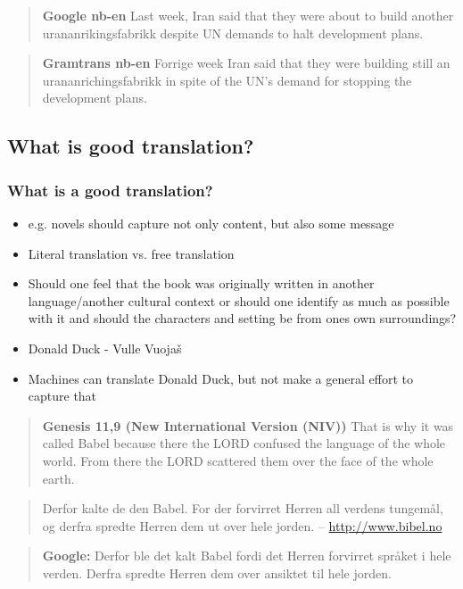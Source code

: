 \documentclass[a4paper,english,12pt]{article}
\begin{document}
\begin{quote}
{\bf Google nb-en}
Last week, Iran said that they were about to build another urananrikingsfabrikk despite UN demands to halt development plans. 
\end{quote}

\begin{quote}
{\bf Gramtrans nb-en}
Forrige week Iran said that they were building still an urananrichingsfabrikk in spite of the UN's demand for stopping the development plans.
\end{quote}

\subsection{What is good translation?}

\subsubsection{What is a good translation?}
\begin{itemize}
\item e.g. novels should capture not only content, but also some message
\item Literal translation vs. free translation
\item Should one feel that the book was originally written in another language/another 
   cultural context or should one identify as much as possible with it and should the characters 
   and setting be from ones own surroundings?
\item Donald Duck - Vulle Vuojaš
\item Machines can translate Donald Duck, but not make a general effort to capture that
\end{itemize}

\begin{quote}
{\bf Genesis 11,9 (New International Version (NIV))}
That is why it was called Babel because there the LORD confused the language of the whole world. From 
there the LORD scattered them over the face of the whole earth.
\end{quote}

\begin{quote}
Derfor kalte de den Babel. For der forvirret Herren all verdens tungemål, og derfra spredte Herren dem ut over hele jorden.
-- \url{http://www.bibel.no}
\end{quote}

\begin{quote}
{\bf Google:}
Derfor ble det kalt Babel fordi det Herren forvirret språket i hele verden. Derfra spredte Herren dem over ansiktet til hele jorden.
\end{quote}
\end{document}
